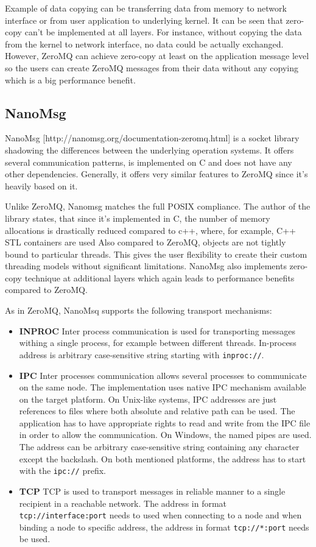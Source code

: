 Example of data copying can be transferring data from memory to network interface or from user application to underlying kernel.  It  can be seen that zero-copy can't be implemented at all layers. For instance,  without copying the data from the kernel to network interface, no data could be actually exchanged. However, ZeroMQ can achieve zero-copy at least on the application message level so the users can create ZeroMQ messages from their data without any copying which is a big performance benefit.
\subsection{NanoMsg}
\label{nanomsg}
NanoMsg [http://nanomsg.org/documentation-zeromq.html] is a socket library shadowing the differences between the underlying operation systems. It offers several communication patterns, is implemented on C and does not have any other dependencies. Generally, it offers very similar features to ZeroMQ since it's heavily based on it.

Unlike ZeroMQ, Nanomsg matches the full POSIX compliance. The author of the library states, that since it's implemented in C, the number of memory allocations is drastically reduced compared to c++, where, for example, C++ STL containers are used  Also compared to ZeroMQ, objects are not tightly bound to particular threads. This gives the user flexibility to create their custom threading models without significant limitations. NanoMsg also implements zero-copy technique at additional layers which again leads to performance benefits compared to ZeroMQ.

As in ZeroMQ, NanoMsq supports the following transport mechanisms:
\begin{itemize}
	\item \textbf{INPROC} \newline
	Inter process communication is used for transporting messages withing a single process, for example between different threads. In-process address is arbitrary case-sensitive string starting with \texttt{inproc://}.
	\item \textbf{IPC}  \newline 
	Inter processes communication allows several processes to communicate on the same node. The implementation uses native IPC mechanism available on the target platform. On Unix-like systems, IPC addresses are just references to files where both absolute and relative path can be used. The application has to have appropriate rights to read and write from the IPC file in order to allow the communication. On Windows, the named pipes are used. The address can be arbitrary case-sensitive string containing any character except the backslash. On both mentioned platforms, the address has to start with the \texttt{ipc://} prefix.
	\item \textbf{TCP} \newline
	TCP is used to transport messages in reliable manner to a single recipient in a reachable network.  The address in format \texttt{tcp://interface:port} needs to used when connecting to a node and when binding a node to specific address, the address in format \texttt{tcp://*:port} needs be used.
\end{itemize}

